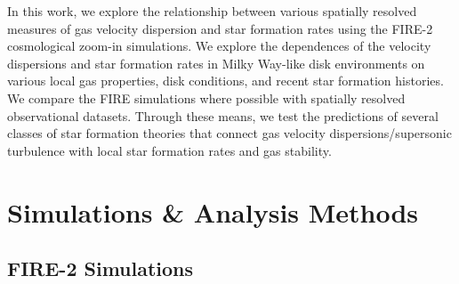 \documentclass[usletter,fleqn,usenatbib]{mnras}
\begin{document}
In this work, we explore the relationship between various spatially resolved measures of gas velocity dispersion and star formation rates using the FIRE-2 cosmological zoom-in simulations.  We explore the dependences of the velocity dispersions and star formation rates in Milky Way-like disk environments on various local gas properties, disk conditions, and recent star formation histories.  We compare the FIRE simulations where possible with spatially resolved observational datasets.  Through these means, we test the predictions of several classes of star formation theories that connect gas velocity dispersions/supersonic turbulence with local star formation rates and gas stability.





\section{Simulations \& Analysis Methods}

\subsection{FIRE-2 Simulations}\label{sec:sims}
\end{document}
